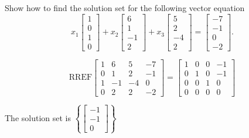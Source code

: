 
\begin{exerciseStatement}


Show how to find the solution set for the following vector equation \[ x_{1} \left[\begin{array}{c}
1 \\
0 \\
1 \\
0
\end{array}\right] + x_{2} \left[\begin{array}{c}
6 \\
1 \\
-1 \\
2
\end{array}\right] + x_{3} \left[\begin{array}{c}
5 \\
2 \\
-4 \\
2
\end{array}\right] = \left[\begin{array}{c}
-7 \\
-1 \\
0 \\
-2
\end{array}\right] .\]


\end{exerciseStatement}
    
\begin{exerciseAnswer} 
\[\mathrm{RREF} \left[\begin{array}{ccc|c}
1 & 6 & 5 & -7 \\
0 & 1 & 2 & -1 \\
1 & -1 & -4 & 0 \\
0 & 2 & 2 & -2
\end{array}\right]  =  \left[\begin{array}{ccc|c}
1 & 0 & 0 & -1 \\
0 & 1 & 0 & -1 \\
0 & 0 & 1 & 0 \\
0 & 0 & 0 & 0
\end{array}\right] \]

The solution set is \( \left\{ \left[\begin{array}{c}
-1 \\
-1 \\
0
\end{array}\right] \right\} \)


\end{exerciseAnswer}
    

